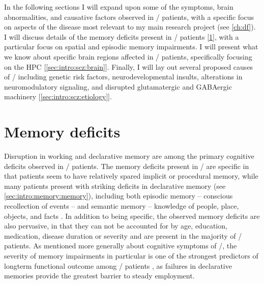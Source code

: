 In the following sections I will expand upon some of the symptoms, brain abnormalities, and causative factors observed in \scz/ patients, with a specific focus on aspects of the disease most relevant to my main research project (see \autoref{ch:df}).
I will discuss details of the memory deficits present in \scz/ patients [\ref{sec:intro:scz:memory}], with a particular focus on spatial and episodic memory impairments.
I will present what we know about specific brain regions affected in \scz/ patients, specifically focusing on the \ac{HPC} [\ref{sec:intro:scz:brain}].
Finally, I will lay out several proposed causes of \scz/ including genetic risk factors, neurodevelopmental insults, alterations in neuromodulatory signaling, and disrupted glutamatergic and GABAergic machinery [\ref{sec:intro:scz:etiology}].

\section{Memory deficits}
\label{sec:intro:scz:memory}
Disruption in working and declarative memory are among the primary cognitive deficits observed in \scz/ patients.
The memory deficits present in \scz/ are specific in that patients seem to have relatively spared implicit or procedural memory, while many patients present with striking deficits in declarative memory (see \autoref{sec:intro:memory:memory}), including both episodic memory -- conscious recollection of events -- and semantic memory -- knowledge of people, place, objects, and facts \citep{O'Carroll2000, Aleman1999, Gold2010}.
In addition to being specific, the observed memory deficits are also pervasive, in that they can not be accounted for by age, education, medication, disease duration or severity \citep{Ranganath2008} and are present in the majority of \scz/ patients.
As mentioned more generally about cognitive symptoms of \scz/, the severity of memory impairments in particular is one of the strongest predictors of longterm functional outcome among \scz/ patients \citep{Green1996}, as failures in declarative memories provide the greatest barrier to steady employment.

